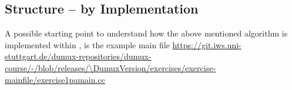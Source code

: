 \subsection{Structure -- by Implementation}
A possible starting point to understand how the above mentioned algorithm is implemented within \Dumux,
is the example main file
\url{https://git.iws.uni-stuttgart.de/dumux-repositories/dumux-course/-/blob/releases/\DumuxVersion/exercises/exercise-mainfile/exercise1pamain.cc}
